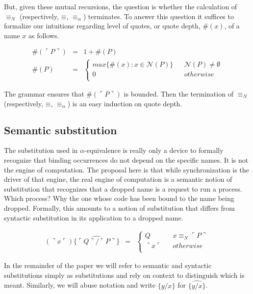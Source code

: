 \documentclass[]{amsart}
\newcommand{\lpquote}{\ulcorner}
\newcommand{\rpquote}{\urcorner}
\newcommand{\id}[1]{\texttt{#1}}
\newcommand{\scong}{\mathbin{\equiv}}
\newcommand{\nameeq}{\mathbin{\equiv_N}}
\newcommand{\alphaeq}{\mathbin{\equiv_{\alpha}}}
\newcommand{\names}[1]{\mathbin{\mathcal{N}(#1)}}
\newcommand{\quotep}[1]{\lpquote #1 \rpquote}
\newcommand{\dropn}[1]{\rpquote #1 \lpquote}
\newcommand{\substp}[2]{\id{\{} \quotep{#1} / \quotep{#2} \id{\}}}
\newcommand{\substn}[2]{\id{\{} #1 / #2 \id{\}}}
\newcommand{\psubstp}[2]{\widehat{\substp{#1}{#2}}}
\newcommand{\psubstn}[2]{\widehat{\substn{#1}{#2}}}
\theoremstyle{definition}
\theoremstyle{remark}
\numberwithin{equation}{subsection}
\begin{document}
But, given these mutual recursions, the question is whether the calculation
of $\nameeq$ (respectively, $\scong$, $\alphaeq$) terminates. To
answer this question it suffices to formalize our intuitions regarding
level of quotes, or quote depth, $\#(x)$, of a name $x$ as
follows.

\begin{eqnarray*}
	\#(\quotep{P}) & = & 1 + \#(P) \\
    \#(P) & = & \left\{
			   \begin{array}{ccc}
				 max\{ \#(x) : x \in \names{P} \} & & \names{P} \neq \emptyset \\
				 0 & & otherwise \\
			   \end{array}
			\right.
\end{eqnarray*}

The grammar ensures that $\#(\quotep{P})$ is bounded. Then the
termination of $\nameeq$ (respectively, $\scong$, $\alphaeq$) is an
easy induction on quote depth.

\subsection{Semantic substitution}

The substitution used in $\alpha$-equivalence is really only a device
to formally recognize that binding occurrences do not depend on the
specific names. It is not the engine of computation. The proposal here
is that while synchronization is the driver of that engine, the real
engine of computation is a semantic notion of substitution that
recognizes that a dropped name is a request to run a process. Which
process? Why the one whose code has been bound to the name being
dropped. Formally, this amounts to a notion of substitution that
differs from syntactic substitution in its application to a dropped
name.

\begin{eqnarray*}
(\dropn{x})  \psubstp{Q}{P}       
		& = & 
		\left\{ 
			\begin{array}{ccc} 
				Q & & x \nameeq \quotep{P} \\
                              	\dropn{x} & & otherwise \\
			\end{array}
		\right.
\end{eqnarray*}

In the remainder of the paper we will refer to semantic and syntactic
substitutions simply as substitutions and rely on context to
distinguish which is meant. Similarly, we will abuse notation and
write $\substn{y}{x}$ for $\psubstn{y}{x}$.
\end{document}
